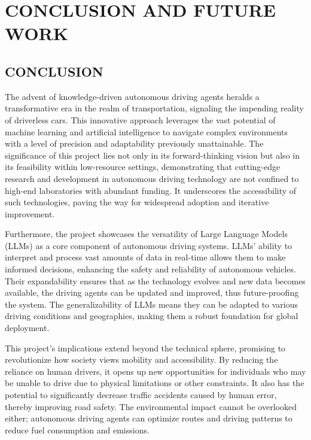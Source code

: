\chapter{\uppercase{Conclusion and Future Work}}
\label{chap:conclusion}
\begin{spacing}{1.5}
\begin{sloppypar}
\section{\uppercase{CONCLUSION}}
The advent of knowledge-driven autonomous driving agents heralds a transformative era in the realm of transportation, signaling the impending reality of driverless cars. This innovative approach leverages the vast potential of machine learning and artificial intelligence to navigate complex environments with a level of precision and adaptability previously unattainable. The significance of this project lies not only in its forward-thinking vision but also in its feasibility within low-resource settings, demonstrating that cutting-edge research and development in autonomous driving technology are not confined to high-end laboratories with abundant funding. It underscores the accessibility of such technologies, paving the way for widespread adoption and iterative improvement.

Furthermore, the project showcases the versatility of Large Language Models (LLMs) as a core component of autonomous driving systems. LLMs' ability to interpret and process vast amounts of data in real-time allows them to make informed decisions, enhancing the safety and reliability of autonomous vehicles. Their expandability ensures that as the technology evolves and new data becomes available, the driving agents can be updated and improved, thus future-proofing the system. The generalizability of LLMs means they can be adapted to various driving conditions and geographies, making them a robust foundation for global deployment.

This project's implications extend beyond the technical sphere, promising to revolutionize how society views mobility and accessibility. By reducing the reliance on human drivers, it opens up new opportunities for individuals who may be unable to drive due to physical limitations or other constraints. It also has the potential to significantly decrease traffic accidents caused by human error, thereby improving road safety. The environmental impact cannot be overlooked either; autonomous driving agents can optimize routes and driving patterns to reduce fuel consumption and emissions.


\end{sloppypar}
\end{spacing}
